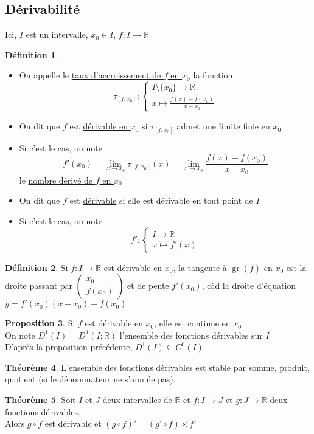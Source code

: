 \documentclass[10pt,a4paper]{article}
\theoremstyle{definition}
\newtheorem{proposition}{Proposition}[section]
\newtheorem{theorem}[proposition]{Théorème}
\newtheorem{definition}[proposition]{Définition}
\DeclareMathOperator{\gr}{gr}
\begin{document}
\subsection{Dérivabilité}
Ici, $I$ est un intervalle, $x_0 \in I$, $f: I \to \mathbb{R}$
\begin{definition}
\hfill
\begin{itemize}
\item On appelle le \uline{taux d'accroissement de $f$ en $x_0$} la fonction
\[\tau_{\left[f, x_0\right]}: \begin{cases}
I \setminus \{ x_0 \} \to \mathbb{R} \\
x \mapsto \frac{f(x) - f(x_0)}{x - x_0}
\end{cases}\]
\item On dit que $f$ est \uline{dérivable en $x_0$} si $\tau_{\left[f, x_0 \right]}$ admet une limite finie en $x_0$
\item Si c'est le cas, on note
\[f'(x_0) = \lim\limits_{x \to x_0} \tau_{ \left[ f, x_0 \right] }(x) = \lim\limits_{x \to x_0} \frac{f(x) - f(x_0)}{x - x_0}\]
le \uline{nombre dérivé de $f$ en $x_0$}
\item On dit que $f$ est \uline{dérivable} si elle est dérivable en tout point de $I$
\item Si c'est le cas, on note
\[f': \begin{cases}
I \to \mathbb{R} \\
x \mapsto f'(x)
\end{cases}\]
\end{itemize}
\end{definition}
\begin{definition}
Si $f: I \to \mathbb{R}$ est dérivable en $x_0$, la tangente à $\gr(f)$ en $x_0$ est la droite passant par $\begin{pmatrix}
x_0 \\
f(x_0)
\end{pmatrix}$ et de pente $f'(x_0)$, càd la droite d'équation $y = f'(x_0)(x - x_0) + f(x_0)$
\end{definition}
\begin{proposition}
Si $f$ est dérivable en $x_0$, elle est continue en $x_0$ \\
On note $D^1(I) = D^1(I; \mathbb{R})$ l'ensemble des fonctions dérivables sur $I$ \\
D'après la proposition précédente, $D^1(I) \subseteq C^0(I)$
\end{proposition}
\begin{theorem}
L'ensemble des fonctions dérivables est stable par somme, produit, quotient (si le dénominateur ne s'annule pas).
\end{theorem}
\begin{theorem}
Soit $I$ et $J$ deux intervalles de $\mathbb{R}$ et $f:I \to J$ et $g: J \to \mathbb{R}$ deux fonctions dérivables. \\
Alors $g \circ f$ est dérivable et $(g \circ f)' = (g' \circ f) \times f'$
\end{theorem}
\end{document}
